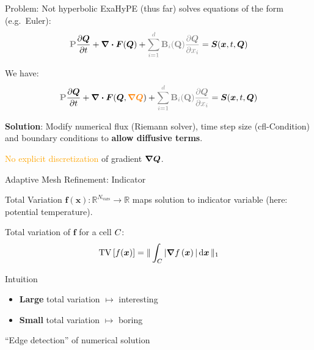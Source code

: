 \documentclass[aspectratio=169]{beamer}
\begin{document}
\begin{frame}{Problem: Not hyperbolic}
  ExaHyPE (thus far) solves equations of the form (e.g.\ Euler):
  \begin{equation}
  \label{eq:conservation-law}
  \mathbf{\textcolor{gray}{P}}\pdv{\Q}{t} + \divergence{\flux(\Q)}
 +  \textcolor{gray}{\sum_{i=1}^d \mathbf{B}_i (\mathbf{Q}) \pdv{\Q}{x_i}}
  = \source(\bm{x}, t, \Q)
\end{equation}

We have:
\begin{equation}
  \label{eq:conservation-law-gradient}
  \mathbf{\textcolor{gray}{P}}\pdv{\Q}{t} + \divergence{\flux(\Q, \textcolor{orange}{\gradQ})}
 +  \textcolor{gray}{\sum_{i=1}^d \mathbf{B}_i (\mathbf{Q}) \pdv{\Q}{x_i}}
  = \source(\bm{x}, t, \Q)
\end{equation}

\textbf{Solution}:
Modify numerical flux (Riemann solver), time step size (cfl-Condition) and boundary conditions to \textbf{allow diffusive terms}.

\textcolor{orange}{No explicit discretization} of gradient $\gradQ$.
\end{frame}

\begin{frame}{Adaptive Mesh Refinement: Indicator}
  \begin{block}{Total Variation}
  $\bm{f}(\bm{x}): \mathbb{R}^{N_\text{vars}} \to \mathbb{R}$ maps solution to indicator variable (here: potential temperature).

  Total variation of $\bm{f}$ for a cell $C_{}$:
\begin{equation}
  \label{eq:tv}
  \tv \left[ f(\bm{x}) \right] =
  \Vert
\intdcell{ \vert \gradient{f \left( \bm{x} \right)} \vert }
\Vert_1
\end{equation}
    
  \end{block}

\begin{block}{Intuition}
  \begin{itemize}
\item \textbf{Large} total variation $\mapsto$ interesting
\item \textbf{Small} total variation $\mapsto$ boring
  \end{itemize}
  \enquote{Edge detection} of numerical solution
\end{block}

\end{frame}  
\end{document}

